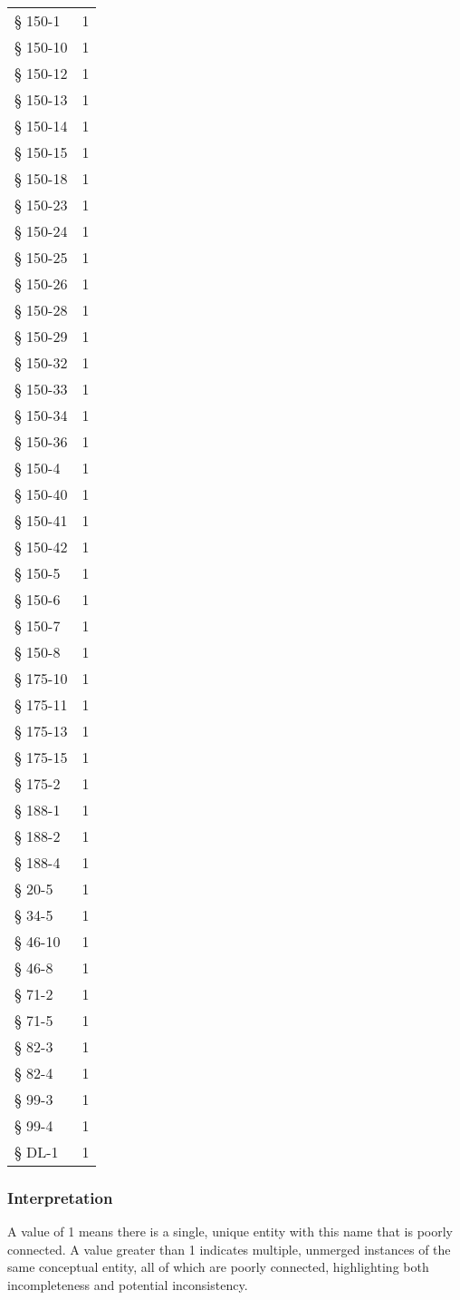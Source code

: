 \begin{longtable}{p{} p{}}
§ 150-1 & 1 \\
§ 150-10 & 1 \\
§ 150-12 & 1 \\
§ 150-13 & 1 \\
§ 150-14 & 1 \\
§ 150-15 & 1 \\
§ 150-18 & 1 \\
§ 150-23 & 1 \\
§ 150-24 & 1 \\
§ 150-25 & 1 \\
§ 150-26 & 1 \\
§ 150-28 & 1 \\
§ 150-29 & 1 \\
§ 150-32 & 1 \\
§ 150-33 & 1 \\
§ 150-34 & 1 \\
§ 150-36 & 1 \\
§ 150-4 & 1 \\
§ 150-40 & 1 \\
§ 150-41 & 1 \\
§ 150-42 & 1 \\
§ 150-5 & 1 \\
§ 150-6 & 1 \\
§ 150-7 & 1 \\
§ 150-8 & 1 \\
§ 175-10 & 1 \\
§ 175-11 & 1 \\
§ 175-13 & 1 \\
§ 175-15 & 1 \\
§ 175-2 & 1 \\
§ 188-1 & 1 \\
§ 188-2 & 1 \\
§ 188-4 & 1 \\
§ 20-5 & 1 \\
§ 34-5 & 1 \\
§ 46-10 & 1 \\
§ 46-8 & 1 \\
§ 71-2 & 1 \\
§ 71-5 & 1 \\
§ 82-3 & 1 \\
§ 82-4 & 1 \\
§ 99-3 & 1 \\
§ 99-4 & 1 \\
§ DL-1 & 1 \\
\bottomrule
\end{longtable}
\subsubsection*{Interpretation}
A value of 1 means there is a single, unique entity with this name that is poorly connected. A value greater than 1 indicates multiple, unmerged instances of the same conceptual entity, all of which are poorly connected, highlighting both incompleteness and potential inconsistency.
\clearpage
